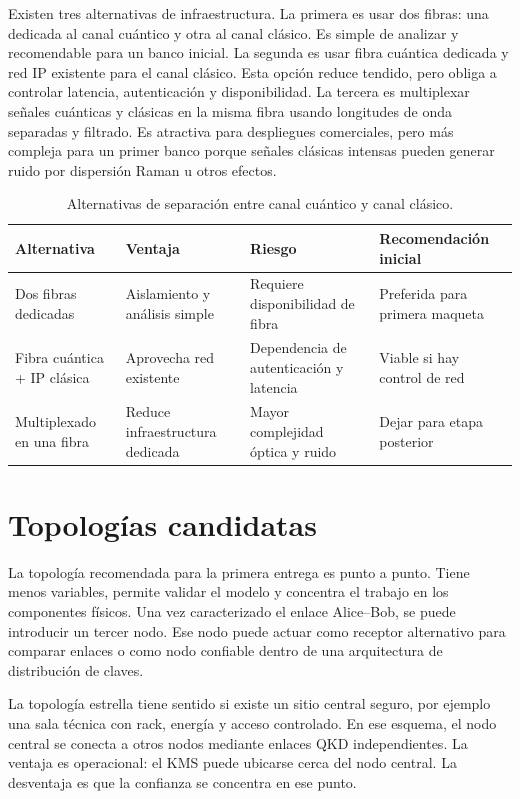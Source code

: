 Existen tres alternativas de infraestructura. La primera es usar dos fibras: una dedicada al canal cuántico y otra al canal clásico. Es simple de analizar y recomendable para un banco inicial. La segunda es usar fibra cuántica dedicada y red IP existente para el canal clásico. Esta opción reduce tendido, pero obliga a controlar latencia, autenticación y disponibilidad. La tercera es multiplexar señales cuánticas y clásicas en la misma fibra usando longitudes de onda separadas y filtrado. Es atractiva para despliegues comerciales, pero más compleja para un primer banco porque señales clásicas intensas pueden generar ruido por dispersión Raman u otros efectos.

\begin{table}[H]
  \centering
  \begin{tabularx}{\textwidth}{p{}XXX}
    \toprule
    Alternativa & Ventaja & Riesgo & Recomendación inicial \\
    \midrule
    Dos fibras dedicadas & Aislamiento y análisis simple & Requiere disponibilidad de fibra & Preferida para primera maqueta \\
    Fibra cuántica + IP clásica & Aprovecha red existente & Dependencia de autenticación y latencia & Viable si hay control de red \\
    Multiplexado en una fibra & Reduce infraestructura dedicada & Mayor complejidad óptica y ruido & Dejar para etapa posterior \\
    \bottomrule
  \end{tabularx}
  \caption{Alternativas de separación entre canal cuántico y canal clásico.}
  \label{tab:canales_campus}
\end{table}

\section{Topologías candidatas}

La topología recomendada para la primera entrega es punto a punto. Tiene menos variables, permite validar el modelo y concentra el trabajo en los componentes físicos. Una vez caracterizado el enlace Alice--Bob, se puede introducir un tercer nodo. Ese nodo puede actuar como receptor alternativo para comparar enlaces o como nodo confiable dentro de una arquitectura de distribución de claves.

La topología estrella tiene sentido si existe un sitio central seguro, por ejemplo una sala técnica con rack, energía y acceso controlado. En ese esquema, el nodo central se conecta a otros nodos mediante enlaces QKD independientes. La ventaja es operacional: el KMS puede ubicarse cerca del nodo central. La desventaja es que la confianza se concentra en ese punto.

